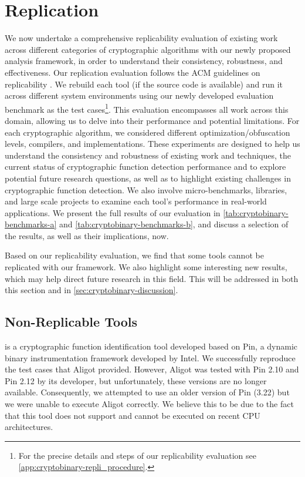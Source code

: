 \section{Replication}
\label{sec:cryptobinary-replication}

We now undertake a comprehensive replicability evaluation of existing work across different categories of cryptographic algorithms with our newly proposed analysis framework, in order to understand their consistency, robustness, and effectiveness. Our replication evaluation follows the ACM guidelines on replicability \cite{rar}. We rebuild each tool (if the source code is available) and run it across different system environments using our newly developed evaluation benchmark as the test cases\footnote{For the precise details and steps of our replicability evaluation see \autoref{app:cryptobinary-repli_procedure}.}.
This evaluation encompasses all work across this domain, allowing us to delve into their performance and potential limitations. For each cryptographic algorithm, we considered different optimization/obfuscation levels, compilers, and implementations. These experiments are designed to help us understand the consistency and robustness of existing work and techniques, the current status of cryptographic function detection performance and to explore potential future research questions, as well as to highlight existing challenges in cryptographic function detection.  We also involve micro-benchmarks, libraries, and large scale projects to examine each tool's performance in real-world applications.
We present the full results of our evaluation in \autoref{tab:cryptobinary-benchmarks-a} and \autoref{tab:cryptobinary-benchmarks-b}, and discuss a selection of the results, as well as their implications, now.

Based on our replicability evaluation, we find that some tools cannot be replicated with our framework. We also highlight some interesting new results, which may help direct future research in this field. This will be addressed in both this section and in \autoref{sec:cryptobinary-discussion}.





\subsection{Non-Replicable Tools}

 is a cryptographic function identification tool developed based on Pin, a dynamic binary instrumentation framework developed by Intel. We successfully reproduce the test cases that Aligot provided. However, Aligot was tested with Pin 2.10 and Pin 2.12 by its developer, but unfortunately, these versions are no longer available. Consequently, we attempted to use an older version of Pin (3.22) but we were unable to execute Aligot correctly. We believe this to be due to the fact that this tool does not support and cannot be executed on recent CPU architectures.



